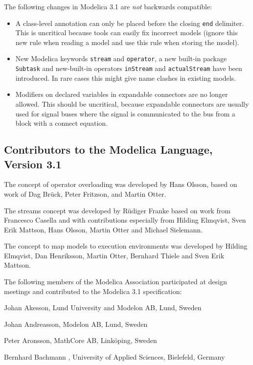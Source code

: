 The following changes in Modelica 3.1 are \emph{not} backwards compatible:
\begin{itemize}
\item
  A class-level annotation can only be placed before the closing \lstinline!end! delimiter.
  This is uncritical because tools can easily fix incorrect models (ignore this new rule when reading a model and use this rule when storing the model).
\item
  New Modelica keywords \lstinline!stream! and \lstinline!operator!, a new built-in
  package \lstinline!Subtask! and new-built-in operators \lstinline!inStream! and
  \lstinline!actualStream! have been introduced. In rare cases this might give
  name clashes in existing models.
\item
  Modifiers on declared variables in expandable connectors are no longer
  allowed. This should be uncritical, because expandable connectors are
  usually used for signal buses where the signal is communicated to the
  bus from a block with a connect equation.
\end{itemize}

\subsection{Contributors to the Modelica Language, Version 3.1}\label{contributors-to-the-modelica-language-version-3-1}

The concept of operator overloading was developed by Hans Olsson, based
on work of Dag Brück, Peter Fritzson, and Martin Otter.

The streams concept was developed by Rüdiger Franke based on work from
Francesco Casella and with contributions especially from Hilding
Elmqvist, Sven Erik Mattson, Hans Olsson, Martin Otter and Michael
Sielemann.

The concept to map models to execution environments was developed by
Hilding Elmqvist, Dan Henriksson, Martin Otter, Bernhard Thiele and Sven
Erik Mattson.

The following members of the Modelica Association participated at design
meetings and contributed to the Modelica 3.1 specification:

Johan Akesson, Lund University and Modelon AB, Lund, Sweden

Johan Andreasson, Modelon AB, Lund, Sweden

Peter Aronsson, MathCore AB, Linköping, Sweden

Bernhard Bachmann , University of Applied Sciences, Bielefeld, Germany

